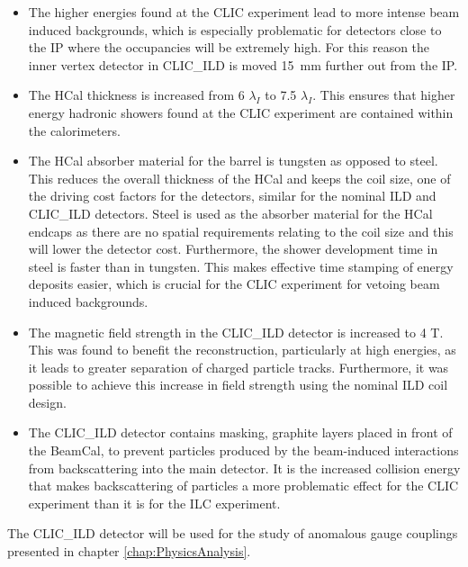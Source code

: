 \begin{itemize}
\item The higher energies found at the CLIC experiment lead to more intense beam induced backgrounds, which is especially problematic for detectors close to the IP where the occupancies will be extremely high.  For this reason the inner vertex detector in CLIC\_ILD is moved 15~mm further out from the IP.    
\item The HCal thickness is increased from 6 $\lambda_{I}$ to 7.5 $\lambda_{I}$.  This ensures that higher energy hadronic showers found at the CLIC experiment are contained within the calorimeters.  
\item The HCal absorber material for the barrel is tungsten as opposed to steel.  This reduces the overall thickness of the HCal and keeps the coil size, one of the driving cost factors for the detectors, similar for the nominal ILD and CLIC\_ILD detectors.  Steel is used as the absorber material for the HCal endcaps as there are no spatial requirements relating to the coil size and this will lower the detector cost.  Furthermore, the shower development time in steel is faster than in tungsten.  This makes effective time stamping of energy deposits easier, which is crucial for the CLIC experiment for vetoing beam induced backgrounds.  
\item The magnetic field strength in the CLIC\_ILD detector is increased to 4 T.  This was found to benefit the reconstruction, particularly at high energies, as it leads to greater separation of charged particle tracks.  Furthermore, it was possible to achieve this increase in field strength using the nominal ILD coil design.   
\item The CLIC\_ILD detector contains masking, graphite layers placed in front of the BeamCal, to prevent particles produced by the beam-induced interactions from backscattering into the main detector.  It is the increased collision energy that makes backscattering of particles a more problematic effect for the CLIC experiment than it is for the ILC experiment.   
\end{itemize}  

The CLIC\_ILD detector will be used for the study of anomalous gauge couplings presented in chapter \ref{chap:PhysicsAnalysis}.


